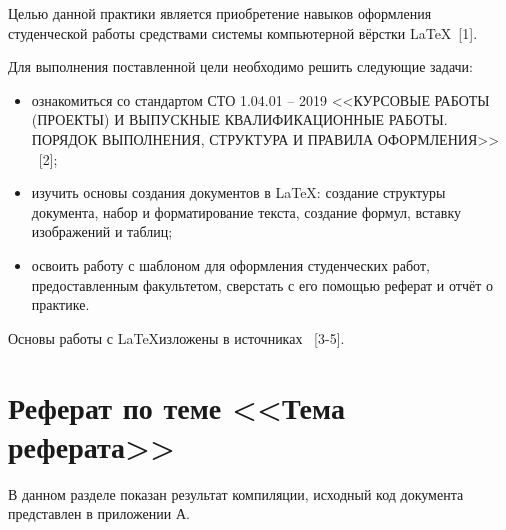 \documentclass[bachelor, och, pract]{SCWorks}
\begin{document}
\tableofcontents






\intro
Целью данной практики является приобретение навыков оформления студенческой работы средствами системы компьютерной вёрстки \LaTeX \ [1].

Для выполнения поставленной цели необходимо решить следующие задачи:
\begin{itemize}
    \item ознакомиться со стандартом СТО 1.04.01 -- 2019 <<КУРСОВЫЕ РАБОТЫ (ПРОЕКТЫ) И ВЫПУСКНЫЕ КВАЛИФИКАЦИОННЫЕ РАБОТЫ. ПОРЯДОК ВЫПОЛНЕНИЯ, СТРУКТУРА И ПРАВИЛА ОФОРМЛЕНИЯ>> \ [2];
    \item изучить основы создания документов в \LaTeX: создание структуры документа, набор и форматирование текста, создание формул, вставку изображений и таблиц;
    \item освоить работу с шаблоном для оформления студенческих работ, предоставленным факультетом, сверстать с его помощью реферат и отчёт о практике.
\end{itemize}

Основы работы с \LaTeX изложены в источниках \ [3-5].

\section{Реферат по теме <<Тема реферата>>}

В данном разделе показан результат компиляции, исходный код документа представлен в приложении А.


\end{document}
